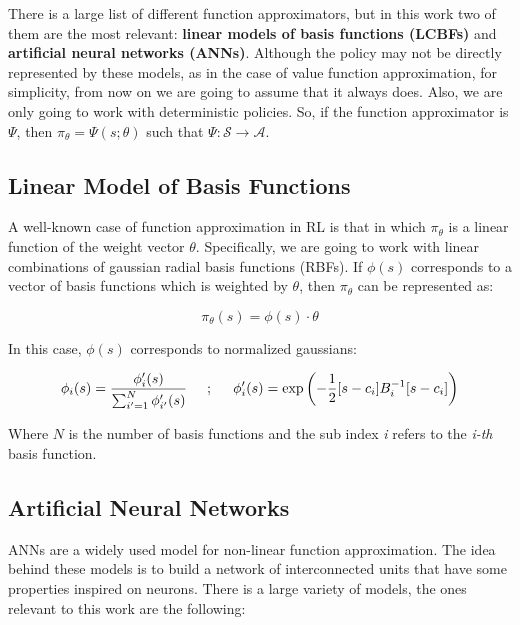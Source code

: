 There is a large list of different function approximators, but in this work two of them are the most relevant: \textbf{linear models of basis functions (LCBFs)} and \textbf{artificial neural networks (ANNs)}. Although the policy may not be directly represented by these models, as in the case of value function approximation, for simplicity, from now on we are going to assume that it always does. Also, we are only going to work with deterministic policies. So, if the function approximator is $\Psi$, then $\pi_{\theta} = \Psi(s;\theta)$ such that $\Psi: \mathcal{S} \to \mathcal{A}$.

\subsection{Linear Model of Basis Functions \cite{busoniu2010reinforcement}}
A well-known case of function approximation in RL is that in which $\pi_{\theta}$ is a linear function of
the weight vector $\theta$. Specifically, we are going to work with linear combinations of gaussian radial basis functions (RBFs). If $\phi(s)$ corresponds to a vector of basis functions which is weighted by $\theta$, then $\pi_{\theta}$ can be represented as:

\begin{equation}
    \pi_{\theta}(s) = \phi(s) \cdot \theta
    \label{eq:lcbf}
\end{equation}

In this case, $\phi(s)$ corresponds to normalized gaussians:

\begin{equation}
    \phi_{i}(s) = \frac{\phi'_{i}(s)}{\sum_{i'=1}^{N}{\phi'_{i'}(s)}}
    \hspace{0.5cm};
    \hspace{0.5cm}
    \phi'_{i}(s) = \exp\left( -\frac{1}{2}[s - c_{i}]B^{-1}_{i}[s-c_{i}]\right)
\end{equation}

\noindent Where $N$ is the number of basis functions and the sub index \emph{i} refers to the \emph{i-th} basis function.

\subsection{Artificial Neural Networks \cite{goodfellow2016deep, nielsen2015neural}}

ANNs are a widely used model for non-linear function approximation. The idea behind these models is to build a network of interconnected units that have some properties inspired on neurons. There is a large variety of models, the ones relevant to this work are the following:

